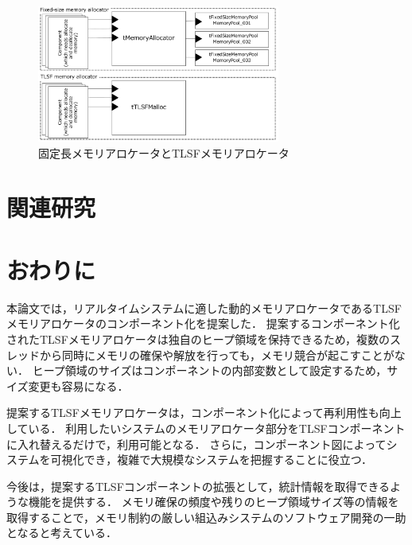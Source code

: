 \documentclass[submit,techrep]{ipsj_v2/UTF8/ipsj}
\begin{document}
\begin{figure}[t]
    \centering
    \includegraphics[width=8cm,clip]{figure/UseCase_TINET.pdf}
    \caption{固定長メモリアロケータとTLSFメモリアロケータ}
    \label{fig:UseCase_TINET}
\end{figure}
    

\section{関連研究}
\label{sec:RelatedWork}

\section{おわりに}
\label{sec:Conclusion}

本論文では，リアルタイムシステムに適した動的メモリアロケータであるTLSFメモリアロケータのコンポーネント化を提案した．
提案するコンポーネント化されたTLSFメモリアロケータは独自のヒープ領域を保持できるため，複数のスレッドから同時にメモリの確保や解放を行っても，メモリ競合が起こすことがない．
ヒープ領域のサイズはコンポーネントの内部変数として設定するため，サイズ変更も容易になる．

提案するTLSFメモリアロケータは，コンポーネント化によって再利用性も向上している．
利用したいシステムのメモリアロケータ部分をTLSFコンポーネントに入れ替えるだけで，利用可能となる．
さらに，コンポーネント図によってシステムを可視化でき，複雑で大規模なシステムを把握することに役立つ．

今後は，提案するTLSFコンポーネントの拡張として，統計情報を取得できるような機能を提供する．
メモリ確保の頻度や残りのヒープ領域サイズ等の情報を取得することで，メモリ制約の厳しい組込みシステムのソフトウェア開発の一助となると考えている．



\end{document}
